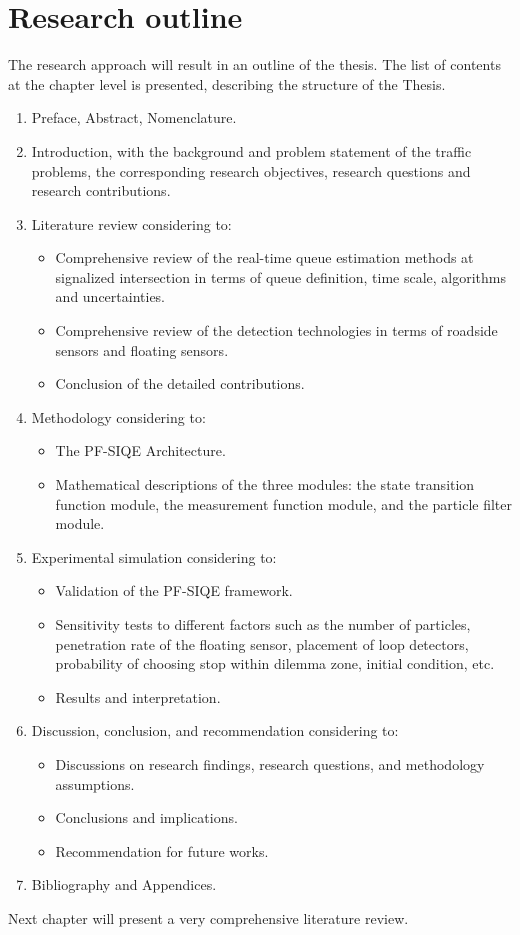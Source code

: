 \section{Research outline}
The research approach will result in an outline of the thesis. The list of contents at the chapter level is presented, describing the structure of the Thesis.
\begin{enumerate}
  \item Preface, Abstract, Nomenclature.
  \item Introduction, with the background and problem statement of the traffic problems, the corresponding research objectives, research questions and research contributions. 
  \item Literature review considering to:
  \begin{itemize}
      \item Comprehensive review of the real-time queue estimation methods at signalized intersection in terms of queue definition, time scale, algorithms and uncertainties.
      \item Comprehensive review of the detection technologies in terms of roadside sensors and floating sensors.
      \item Conclusion of the detailed contributions.
  \end{itemize}
  \item Methodology considering to:
  \begin{itemize}
      \item The PF-SIQE Architecture.
      \item Mathematical descriptions of the three modules: the state transition function module, the measurement function module, and the particle filter module.
  \end{itemize}
  \item Experimental simulation considering to:
  \begin{itemize}
      \item Validation of the PF-SIQE framework.
      \item Sensitivity tests to different factors such as the number of particles, penetration rate of the floating sensor, placement of loop detectors, probability of choosing stop within dilemma zone, initial condition, etc.
      \item Results and interpretation.
  \end{itemize}
  \item Discussion, conclusion, and recommendation considering to:
  \begin{itemize}
      \item Discussions on research findings, research questions, and methodology assumptions.
      \item Conclusions and implications.
      \item Recommendation for future works.
  \end{itemize}
  \item Bibliography and Appendices.
\end{enumerate}
Next chapter will present a very comprehensive literature review.